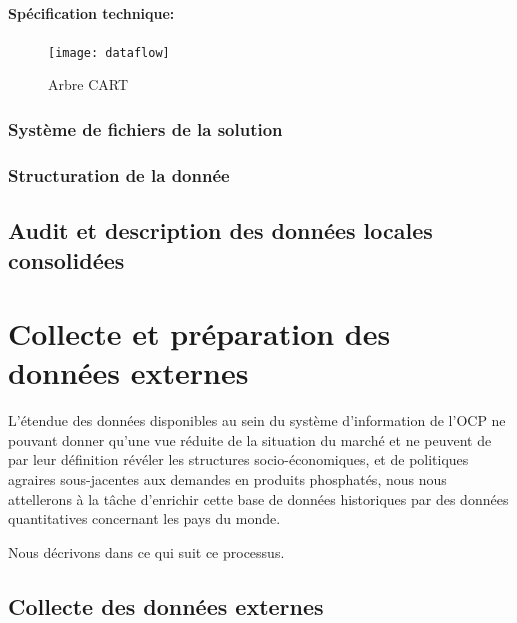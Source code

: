 	\paragraph{Spécification technique:\\}
		\begin{figure}
		    		\centering
		    		\texttt{[image: dataflow]}
		    		\caption{Arbre CART}
		    		\label{fig:DF}
		\end{figure}
	\subsubsection{Système de fichiers de la solution}
	\subsubsection{Structuration de la donnée}
	\subsection{Audit et description des données locales consolidées}
	\section{Collecte et préparation des données externes}
	L'étendue des données disponibles au sein du système d'information de l'OCP ne pouvant donner qu'une vue réduite de la situation du marché et ne peuvent de par leur définition révéler les structures socio-économiques,  et de politiques agraires sous-jacentes aux demandes en produits phosphatés, nous nous attellerons à la tâche d'enrichir cette base de données historiques par des données quantitatives concernant les pays du monde.
	\par
	Nous décrivons dans ce qui suit ce processus. 
	\subsection{Collecte des données externes}
